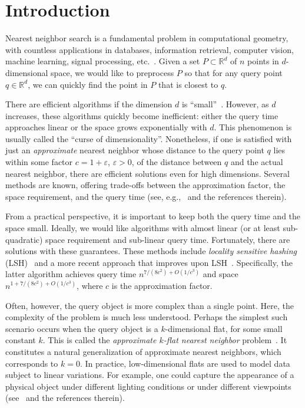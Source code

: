 \documentclass[a4paper,11pt]{paper}
\newcommand{\mathset}[1]{\ensuremath {\mathbb {#1}}}
\newcommand{\eps}{\varepsilon}
\newcommand{\R}{\mathset{R}}
\begin{document}
\section{Introduction}

Nearest neighbor search is a fundamental
problem in computational geometry, with
countless applications in databases,
information retrieval, computer vision,
machine learning, signal processing,
etc.~\cite{Indyk04}.  Given a set
$P \subset \R^d$ of $n$ points in
$d$-dimensional
space, we would like to preprocess $P$
so that for any query point $q \in \R^d$,
we can quickly find the point in $P$
that is closest to $q$.

There are efficient
algorithms if the dimension $d$ is
``small''~\cite{Clarkson88,Meiser93}.
However, as $d$ increases, these
algorithms quickly become inefficient:
either the query time approaches linear
or the space grows exponentially with
$d$. This phenomenon is usually called
the ``curse of dimensionality''.
Nonetheless, if one is satisfied with
just an \emph{approximate} nearest
neighbor whose distance to the query
point $q$ lies within some factor
$c=1+\eps$, $\eps > 0$, of the distance between
$q$ and the actual nearest neighbor,
there are efficient solutions even for high
dimensions. Several methods are known,
offering trade-offs between the
approximation factor, the space
requirement, and the query time (see,
e.g.,~\cite{Andoni09,AndoniInNgRa14}
and the references therein).

From a practical perspective, it is
important to keep both the query time
and the space small. Ideally, we would
like algorithms with almost linear
(or at least sub-quadratic) space
requirement and sub-linear query time.
Fortunately, there are solutions with
these guarantees. These methods
include \emph{locality sensitive hashing}
(LSH)~\cite{IndykMo98,KushilevitzOsRa98}
and a more recent approach that improves
upon LSH~\cite{AndoniInNgRa14}. Specifically,
the latter algorithm achieves query time
$n^{7/(8c^{2})+O(1/c^{3})}$ and space
$n^{1+7/(8c^2)+O(1/c^{3})}$, where
$c$ is the approximation factor.

Often, however, the query object is more
complex than a single point. Here,
the complexity of the problem is much less
understood. Perhaps the simplest such
scenario occurs when the query object is
a $k$-dimensional flat, for some small
constant $k$. This is called the
\emph{approximate $k$-flat nearest neighbor}
problem~\cite{AndoniInKrNg09}. It constitutes
a natural generalization of approximate
nearest neighbors, which corresponds
to $k=0$.  In practice, low-dimensional
flats are used to model data subject
to linear variations.  For example, one
could capture the appearance of a
physical object under different lighting
conditions or under different
viewpoints (see~\cite{BasriHaZe07} and the references therein).
\end{document}
